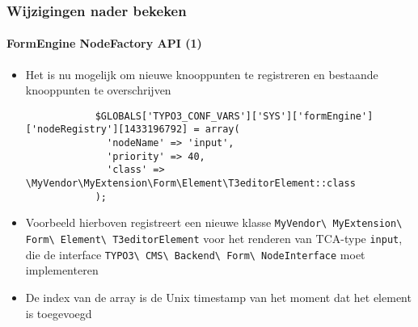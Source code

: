 \begin{frame}[fragile]
	\frametitle{Wijzigingen nader bekeken}
	\framesubtitle{FormEngine NodeFactory API (1)}

	\lstset{basicstyle=\tiny\ttfamily}

	\begin{itemize}

		\item Het is nu mogelijk om nieuwe knooppunten te registreren en bestaande knooppunten te overschrijven

		\begin{lstlisting}
			$GLOBALS['TYPO3_CONF_VARS']['SYS']['formEngine']['nodeRegistry'][1433196792] = array(
			  'nodeName' => 'input',
			  'priority' => 40,
			  'class' => \MyVendor\MyExtension\Form\Element\T3editorElement::class
			);
		\end{lstlisting}

		\item Voorbeeld hierboven registreert een nieuwe klasse
			\texttt{MyVendor\textbackslash
				MyExtension\textbackslash
				Form\textbackslash
				Element\textbackslash
				T3editorElement}
			voor het renderen van TCA-type \texttt{input}, die de interface
			\texttt{TYPO3\textbackslash
				CMS\textbackslash
				Backend\textbackslash
				Form\textbackslash
				NodeInterface}
			moet implementeren

		\item De index van de array is de Unix timestamp van het moment dat het element is toegevoegd

	\end{itemize}

\end{frame}


